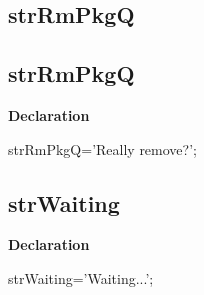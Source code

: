 \documentclass{report}
\newif\ifpdf
\begin{document}
\subsection*{\large{\textbf{strRmPkgQ}}\normalsize\hspace{1ex}\hrulefill}
\else
\subsection*{strRmPkgQ}
\fi
\label{trstrings-strRmPkgQ}
\begin{list}{}{
\setlength{\itemindent}{0cm}
\setlength{\listparindent}{0cm}
\setlength{\leftmargin}{\evensidemargin}
\addtolength{\leftmargin}{\tmplength}
\settowidth{\labelsep}{X}
\addtolength{\leftmargin}{\labelsep}
\setlength{\labelwidth}{\tmplength}
}
\item[\textbf{Declaration}\hfill]
\ifpdf
\begin{flushleft}
\fi
\begin{ttfamily}
strRmPkgQ='Really remove?';\end{ttfamily}

\ifpdf
\end{flushleft}
\fi

\end{list}
\ifpdf
\subsection*{\large{\textbf{strWaiting}}\normalsize\hspace{1ex}\hrulefill}
\else
\subsection*{strWaiting}
\fi
\label{trstrings-strWaiting}
\begin{list}{}{
\setlength{\itemindent}{0cm}
\setlength{\listparindent}{0cm}
\setlength{\leftmargin}{\evensidemargin}
\addtolength{\leftmargin}{\tmplength}
\settowidth{\labelsep}{X}
\addtolength{\leftmargin}{\labelsep}
\setlength{\labelwidth}{\tmplength}
}
\item[\textbf{Declaration}\hfill]
\ifpdf
\begin{flushleft}
\fi
\begin{ttfamily}
strWaiting='Waiting...';\end{ttfamily}

\ifpdf
\end{flushleft}
\fi

\end{list}
\ifpdf
\end{document}
